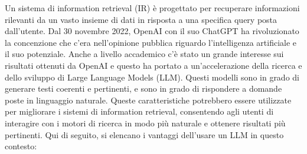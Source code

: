 Un sistema di information retrieval (IR) è progettato per recuperare informazioni rilevanti da un vasto insieme di dati in risposta a una specifica query posta dall'utente. 
Dal 30 novembre 2022, OpenAI con il suo ChatGPT ha rivoluzionato la concenzione che c'era nell'opinione pubblica riguardo l'intelligenza artificiale e il suo potenziale. Anche a livello accademico c'è stato un grande interesse sui risultati ottenuti da OpenAI e questo ha portato a un'accelerazione della ricerca e dello sviluppo di Large Language Models (LLM).
Questi modelli sono in grado di generare testi coerenti e pertinenti, e sono in grado di rispondere a domande poste in linguaggio naturale. 
Queste caratteristiche potrebbero essere utilizzate per migliorare i sistemi di information retrieval, consentendo agli utenti di interagire con i motori di ricerca in modo più naturale e ottenere risultati più pertinenti.
Qui di seguito, si elencano i vantaggi dell'usare un LLM in questo contesto:
